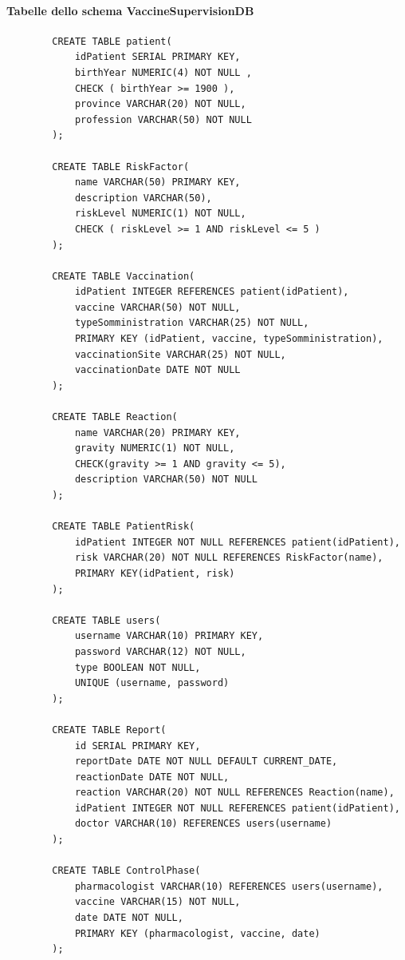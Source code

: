 \documentclass[11pt]{article}
\begin{document}
    \paragraph*{Tabelle dello schema VaccineSupervisionDB}
        \begin{verbatim}
        CREATE TABLE patient(
            idPatient SERIAL PRIMARY KEY,
            birthYear NUMERIC(4) NOT NULL ,
            CHECK ( birthYear >= 1900 ),
            province VARCHAR(20) NOT NULL,
            profession VARCHAR(50) NOT NULL
        );
        
        CREATE TABLE RiskFactor(
            name VARCHAR(50) PRIMARY KEY,
            description VARCHAR(50),
            riskLevel NUMERIC(1) NOT NULL,
            CHECK ( riskLevel >= 1 AND riskLevel <= 5 )
        );
        
        CREATE TABLE Vaccination(
            idPatient INTEGER REFERENCES patient(idPatient),
            vaccine VARCHAR(50) NOT NULL,
            typeSomministration VARCHAR(25) NOT NULL,
            PRIMARY KEY (idPatient, vaccine, typeSomministration),
            vaccinationSite VARCHAR(25) NOT NULL,
            vaccinationDate DATE NOT NULL
        );
        
        CREATE TABLE Reaction(
            name VARCHAR(20) PRIMARY KEY,
            gravity NUMERIC(1) NOT NULL,
            CHECK(gravity >= 1 AND gravity <= 5),
            description VARCHAR(50) NOT NULL
        );
        
        CREATE TABLE PatientRisk(
            idPatient INTEGER NOT NULL REFERENCES patient(idPatient),
            risk VARCHAR(20) NOT NULL REFERENCES RiskFactor(name),
            PRIMARY KEY(idPatient, risk)
        );
        
        CREATE TABLE users(
            username VARCHAR(10) PRIMARY KEY,
            password VARCHAR(12) NOT NULL,
            type BOOLEAN NOT NULL,
            UNIQUE (username, password)
        );
        
        CREATE TABLE Report(
            id SERIAL PRIMARY KEY,
            reportDate DATE NOT NULL DEFAULT CURRENT_DATE,
            reactionDate DATE NOT NULL,
            reaction VARCHAR(20) NOT NULL REFERENCES Reaction(name),
            idPatient INTEGER NOT NULL REFERENCES patient(idPatient),
            doctor VARCHAR(10) REFERENCES users(username)
        );
        
        CREATE TABLE ControlPhase(
            pharmacologist VARCHAR(10) REFERENCES users(username),
            vaccine VARCHAR(15) NOT NULL,
            date DATE NOT NULL,
            PRIMARY KEY (pharmacologist, vaccine, date)
        );
        \end{verbatim}
    
\end{document}
